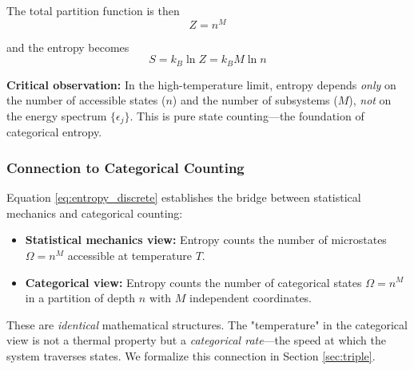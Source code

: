 \documentclass[twocolumn,10pt]{article}
\theoremstyle{remark}
\begin{document}
The total partition function is then
\begin{equation}
    Z = n^M
    \label{eq:total_partition_discrete}
\end{equation}

and the entropy becomes
\begin{equation}
    S = k_B \ln Z = k_B M \ln n
    \label{eq:entropy_discrete}
\end{equation}

\textbf{Critical observation:} In the high-temperature limit, entropy depends \textit{only} on the number of accessible states ($n$) and the number of subsystems ($M$), \textit{not} on the energy spectrum $\{\epsilon_j\}$. This is pure state counting—the foundation of categorical entropy.

\subsubsection{Connection to Categorical Counting}

Equation \eqref{eq:entropy_discrete} establishes the bridge between statistical mechanics and categorical counting:
\begin{itemize}
    \item \textbf{Statistical mechanics view:} Entropy counts the number of microstates $\Omega = n^M$ accessible at temperature $T$.
    
    \item \textbf{Categorical view:} Entropy counts the number of categorical states $\Omega = n^M$ in a partition of depth $n$ with $M$ independent coordinates.
\end{itemize}

These are \textit{identical} mathematical structures. The "temperature" in the categorical view is not a thermal property but a \textit{categorical rate}—the speed at which the system traverses states. We formalize this connection in Section \ref{sec:triple}.
\end{document}
